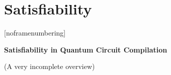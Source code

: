 \section{Satisfiability}[noframenumbering]


\begin{frame}
	
\vfill
\centering

\vspace{-.5cm}\textbf{\Large Satisfiability in Quantum Circuit Compilation}\vspace{-.5cm}

\vfill

\centering
\alert{(A very incomplete overview)}

\end{frame}



